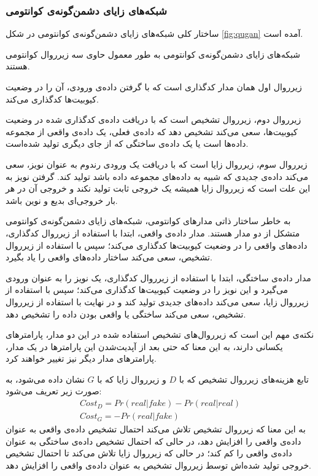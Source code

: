 \subsubsection{شبکه‌های زایای دشمن‌گونه‌ی کوانتومی} \label{sec:qugan}
ساختار کلی شبکه‌های زایای دشمن‌گونه‌ی کوانتومی در شکل 
\ref{fig:qugan}
آمده است.

شبکه‌های زایای دشمن‌گونه‌ی کوانتومی به طور معمول حاوی سه زیرروال کوانتومی هستند.

زیرروال اول همان مدار کدگذاری است که با گرفتن داده‌ی ورودی، آن را در وضعیت کیوبیت‌ها کدگذاری می‌کند.

زیرروال دوم، زیرروال تشخیص است که با دریافت داده‌ی کدگذاری شده در وضعیت کیوبیت‌ها، سعی می‌کند تشخیص دهد که داده‌ی فعلی، یک داده‌ی واقعی از مجموعه داده‌ها است یا یک داده‌ی ساختگی که از جای دیگری تولید شده‌است.

زیرروال سوم، زیرروال زایا است که با دریافت یک ورودی رندوم به عنوان نویز، سعی می‌کند داده‌ی جدیدی که شبیه به داده‌های مجموعه داده باشد تولید کند. گرفتن نویز به این علت است که زیرروال زایا همیشه یک خروجی ثابت تولید نکند و خروجی آن در هر بار خروجی‌ای بدیع و نوین باشد.

به خاطر ساختار ذاتی مدارهای کوانتومی، شبکه‌های زایای دشمن‌گونه‌ی کوانتومی متشکل از دو مدار هستند.
مدار داده‌ی واقعی، ابتدا با استفاده از زیرروال کدگذاری، داده‌های واقعی را در وضعیت کیوبیت‌ها کدگذاری می‌کند؛ سپس با استفاده از زیرروال تشخیص، سعی می‌کند ساختار داده‌های واقعی را یاد بگیرد.

مدار داده‌ی ساختگی، ابتدا با استفاده از زیرروال کدگذاری، یک نویز را به عنوان ورودی می‌گیرد و این نویز را  در وضعیت کیوبیت‌ها کدگذاری می‌کند؛ سپس با استفاده از زیرروال زایا، سعی می‌کند داده‌های جدیدی تولید کند و در نهایت با استفاده از زیرروال تشخیص، سعی می‌کند ساختگی یا واقعی بودن داده را تشخیص دهد.

نکته‌ی مهم این است که زیرروال‌های تشخیص استفاده شده در این دو مدار، پارامترهای یکسانی دارند، به این معنا که حتی بعد از آپدیت‌شدن این پارامترها در یک مدار، پارامترهای مدار دیگر نیز تغییر خواهند کرد.

تابع هزینه‌های زیرروال تشخیص که با 
$D$
و زیرروال زایا که با
$G$
نشان داده می‌شود، به صورت زیر تعریف می‌شود:
\begin{equation} \label{eqn:qugan_cost}
    \begin{gathered}
        Cost_D = Pr(real|fake) - Pr(real|real)  \\
        Cost_G = -Pr(real|fake)
    \end{gathered}
\end{equation}
به این معنا که زیرروال تشخیص تلاش می‌کند احتمال تشخیص داده‌ی واقعی به عنوان داده‌ی واقعی را افزایش دهد، در حالی که احتمال تشخیص داده‌ی ساختگی به عنوان داده‌ی واقعی را کم کند؛ در حالی که زیرروال زایا تلاش می‌کند تا احتمال تشخیص خروجی تولید شده‌اش توسط زیرروال تشخیص به عنوان داده‌ی واقعی را افزایش دهد.


